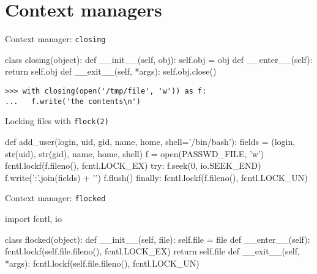 \documentclass{beamer}
\begin{document}
\section{Context managers}


\begin{frame}[fragile]{Context manager: \texttt{closing}}
  \begin{pycode}
     class closing(object):
         def __init__(self, obj):
             self.obj = obj
         def __enter__(self):
             return self.obj
         def __exit__(self, *args):
             self.obj.close()
  \end{pycode}
  \pause
  \begin{verbatim}
>>> with closing(open('/tmp/file', 'w')) as f:
...   f.write('the contents\n')
  \end{verbatim}
\end{frame}

\begin{frame}[fragile]{Locking files with \texttt{flock(2)}}
  \begin{pycode}
    def add_user(login, uid, gid, name, home,
                 shell='/bin/bash'):
        fields = (login, str(uid), str(gid),
                  name, home, shell)
        f = open(PASSWD_FILE, 'w')
        fcntl.lockf(f.fileno(), fcntl.LOCK_EX)
        try:
            f.seek(0, io.SEEK_END)
            f.write(':'.join(fields) + '\n')
            f.flush()
        finally:
            fcntl.lockf(f.fileno(), fcntl.LOCK_UN)
  \end{pycode}
\end{frame}

\begin{frame}[fragile]{Context manager: \texttt{flocked}}
  \begin{pycode}
     import fcntl, io

     class flocked(object):
         def __init__(self, file):
             self.file = file
         def __enter__(self):
             fcntl.lockf(self.file.fileno(), fcntl.LOCK_EX)
             return self.file
         def __exit__(self, *args):
             fcntl.lockf(self.file.fileno(), fcntl.LOCK_UN)
  \end{pycode}
\end{frame}
\end{document}
